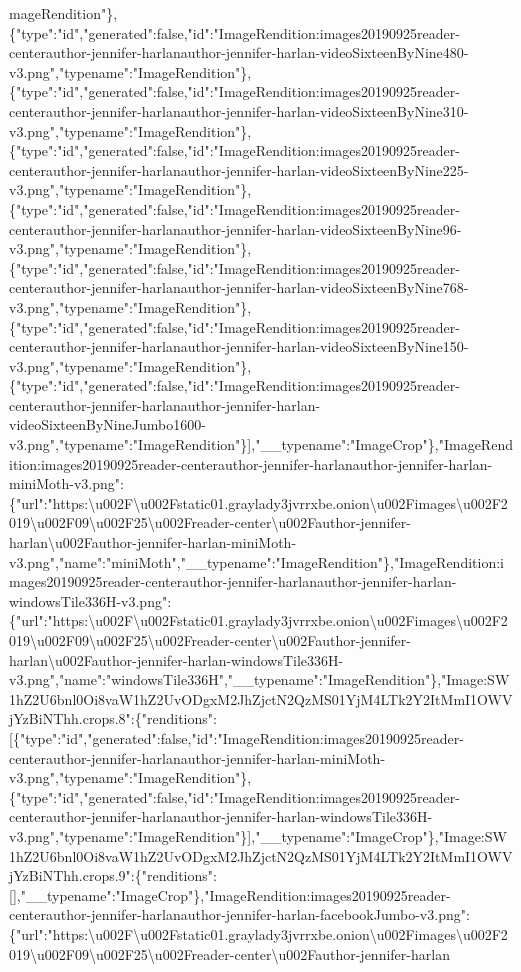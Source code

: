 mageRendition"\},\{"type":"id","generated":false,"id":"ImageRendition:images20190925reader-centerauthor-jennifer-harlanauthor-jennifer-harlan-videoSixteenByNine480-v3.png","typename":"ImageRendition"\},\{"type":"id","generated":false,"id":"ImageRendition:images20190925reader-centerauthor-jennifer-harlanauthor-jennifer-harlan-videoSixteenByNine310-v3.png","typename":"ImageRendition"\},\{"type":"id","generated":false,"id":"ImageRendition:images20190925reader-centerauthor-jennifer-harlanauthor-jennifer-harlan-videoSixteenByNine225-v3.png","typename":"ImageRendition"\},\{"type":"id","generated":false,"id":"ImageRendition:images20190925reader-centerauthor-jennifer-harlanauthor-jennifer-harlan-videoSixteenByNine96-v3.png","typename":"ImageRendition"\},\{"type":"id","generated":false,"id":"ImageRendition:images20190925reader-centerauthor-jennifer-harlanauthor-jennifer-harlan-videoSixteenByNine768-v3.png","typename":"ImageRendition"\},\{"type":"id","generated":false,"id":"ImageRendition:images20190925reader-centerauthor-jennifer-harlanauthor-jennifer-harlan-videoSixteenByNine150-v3.png","typename":"ImageRendition"\},\{"type":"id","generated":false,"id":"ImageRendition:images20190925reader-centerauthor-jennifer-harlanauthor-jennifer-harlan-videoSixteenByNineJumbo1600-v3.png","typename":"ImageRendition"\}{]},"\_\_typename":"ImageCrop"\},"ImageRendition:images20190925reader-centerauthor-jennifer-harlanauthor-jennifer-harlan-miniMoth-v3.png":\{"url":"https:\textbackslash{}u002F\textbackslash{}u002Fstatic01.graylady3jvrrxbe.onion\textbackslash{}u002Fimages\textbackslash{}u002F2019\textbackslash{}u002F09\textbackslash{}u002F25\textbackslash{}u002Freader-center\textbackslash{}u002Fauthor-jennifer-harlan\textbackslash{}u002Fauthor-jennifer-harlan-miniMoth-v3.png","name":"miniMoth","\_\_typename":"ImageRendition"\},"ImageRendition:images20190925reader-centerauthor-jennifer-harlanauthor-jennifer-harlan-windowsTile336H-v3.png":\{"url":"https:\textbackslash{}u002F\textbackslash{}u002Fstatic01.graylady3jvrrxbe.onion\textbackslash{}u002Fimages\textbackslash{}u002F2019\textbackslash{}u002F09\textbackslash{}u002F25\textbackslash{}u002Freader-center\textbackslash{}u002Fauthor-jennifer-harlan\textbackslash{}u002Fauthor-jennifer-harlan-windowsTile336H-v3.png","name":"windowsTile336H","\_\_typename":"ImageRendition"\},"Image:SW1hZ2U6bnl0Oi8vaW1hZ2UvODgxM2JhZjctN2QzMS01YjM4LTk2Y2ItMmI1OWVjYzBiNThh.crops.8":\{"renditions":{[}\{"type":"id","generated":false,"id":"ImageRendition:images20190925reader-centerauthor-jennifer-harlanauthor-jennifer-harlan-miniMoth-v3.png","typename":"ImageRendition"\},\{"type":"id","generated":false,"id":"ImageRendition:images20190925reader-centerauthor-jennifer-harlanauthor-jennifer-harlan-windowsTile336H-v3.png","typename":"ImageRendition"\}{]},"\_\_typename":"ImageCrop"\},"Image:SW1hZ2U6bnl0Oi8vaW1hZ2UvODgxM2JhZjctN2QzMS01YjM4LTk2Y2ItMmI1OWVjYzBiNThh.crops.9":\{"renditions":{[}{]},"\_\_typename":"ImageCrop"\},"ImageRendition:images20190925reader-centerauthor-jennifer-harlanauthor-jennifer-harlan-facebookJumbo-v3.png":\{"url":"https:\textbackslash{}u002F\textbackslash{}u002Fstatic01.graylady3jvrrxbe.onion\textbackslash{}u002Fimages\textbackslash{}u002F2019\textbackslash{}u002F09\textbackslash{}u002F25\textbackslash{}u002Freader-center\textbackslash{}u002Fauthor-jennifer-harlan\